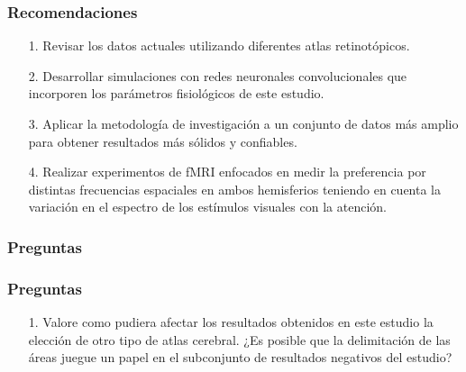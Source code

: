 \documentclass[
11pt, %
%
aspectratio=169, %
]{beamer}
\begin{document}
    \begin{frame}
    	\frametitle{Recomendaciones}
    	
    		\begin{minipage}[t][0.8\textheight][t]{\textwidth}
    		\begin{itemize}
    			\item [1.] Revisar los datos actuales utilizando diferentes atlas retinotópicos.
    		
    		\item [2.] Desarrollar simulaciones con redes neuronales convolucionales que incorporen los parámetros fisiológicos de este estudio. 
    		
    		\item[3.] Aplicar la metodología de investigación a un conjunto de datos más amplio para obtener resultados más sólidos y confiables.
    		
    		\item[4.] Realizar experimentos de fMRI enfocados en medir la preferencia por distintas frecuencias espaciales en ambos hemisferios teniendo en cuenta la variación en el espectro de los estímulos visuales con la atenci\'on. 
    			
    		\end{itemize}
    	\end{minipage}
    
    \end{frame}
   
	


	\begin{frame}
		\frametitle{Preguntas}
			
		
	\end{frame}

	\begin{frame}
	\frametitle{Preguntas}
	\begin{itemize}
		\item[1.] Valore como pudiera afectar los resultados obtenidos en este estudio la elección de otro tipo de atlas cerebral. ¿Es posible que la delimitación de las áreas juegue un papel en el subconjunto de resultados negativos del estudio?	
		
		
	\end{itemize}     
	
	
	
	
\end{frame}
\end{document}
